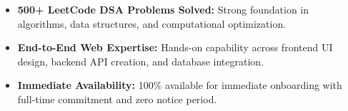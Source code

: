 \documentclass[a4paper,10pt]{article}
\begin{document}
\begin{itemize}

    \item \textbf{500+ LeetCode DSA Problems Solved:} Strong foundation in algorithms, data structures, and computational optimization.

    \item \textbf{End-to-End Web Expertise:} Hands-on capability across frontend UI design, backend API creation, and database integration.

    \item \textbf{Immediate Availability:} 100\% available for immediate onboarding with full-time commitment and zero notice period.

\end{itemize}

\end{document}
